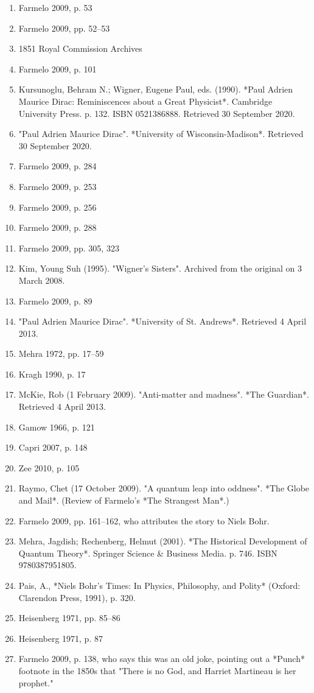 \begin{enumerate}
\item Farmelo 2009, p. 53
\item Farmelo 2009, pp. 52–53
\item 1851 Royal Commission Archives
\item Farmelo 2009, p. 101
\item Kursunoglu, Behram N.; Wigner, Eugene Paul, eds. (1990). *Paul Adrien Maurice Dirac: Reminiscences about a Great Physicist*. Cambridge University Press. p. 132. ISBN 0521386888. Retrieved 30 September 2020.
\item "Paul Adrien Maurice Dirac". *University of Wisconsin-Madison*. Retrieved 30 September 2020.
\item Farmelo 2009, p. 284
\item Farmelo 2009, p. 253
\item Farmelo 2009, p. 256
\item Farmelo 2009, p. 288
\item Farmelo 2009, pp. 305, 323
\item Kim, Young Suh (1995). "Wigner's Sisters". Archived from the original on 3 March 2008.
\item Farmelo 2009, p. 89
\item "Paul Adrien Maurice Dirac". *University of St. Andrews*. Retrieved 4 April 2013.
\item Mehra 1972, pp. 17–59
\item Kragh 1990, p. 17
\item McKie, Rob (1 February 2009). "Anti-matter and madness". *The Guardian*. Retrieved 4 April 2013.
\item Gamow 1966, p. 121
\item Capri 2007, p. 148
\item Zee 2010, p. 105
\item Raymo, Chet (17 October 2009). "A quantum leap into oddness". *The Globe and Mail*. (Review of Farmelo's *The Strangest Man*.)
\item Farmelo 2009, pp. 161–162, who attributes the story to Niels Bohr.
\item Mehra, Jagdish; Rechenberg, Helmut (2001). *The Historical Development of Quantum Theory*. Springer Science & Business Media. p. 746. ISBN 9780387951805.
\item Pais, A., *Niels Bohr's Times: In Physics, Philosophy, and Polity* (Oxford: Clarendon Press, 1991), p. 320.
\item Heisenberg 1971, pp. 85–86
\item Heisenberg 1971, p. 87
\item Farmelo 2009, p. 138, who says this was an old joke, pointing out a *Punch* footnote in the 1850s that "There is no God, and Harriet Martineau is her prophet."

\end{enumerate}

